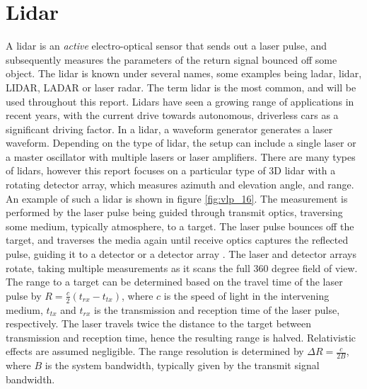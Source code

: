 \section{Lidar}
A lidar is an \textit{active} electro-optical sensor that sends out a laser pulse, and subsequently measures the parameters of the return signal bounced off some object. The lidar is known under several names, some examples being ladar, lidar, LIDAR, LADAR or laser radar. The term lidar is the most common, and will be used throughout this report. Lidars have seen a growing range of applications in recent years, with the current drive towards autonomous, driverless cars as a significant driving factor. In a lidar, a waveform generator generates a laser waveform. Depending on the type of lidar, the setup can include a single laser or a master oscillator with multiple lasers or laser amplifiers. There are many types of lidars, however this report focuses on a particular type of 3D lidar with a rotating detector array, which measures azimuth and elevation angle, and range. An example of such a lidar is shown in figure \ref{fig:vlp_16}. The measurement is performed by the laser pulse being guided through transmit optics, traversing some medium, typically atmosphere, to a target. The laser pulse bounces off the target, and traverses the media again until receive optics captures the reflected pulse, guiding it to a detector or a detector array \cite{SpieLidar}. The laser and detector arrays rotate, taking multiple measurements as it scans the full 360 degree field of view. The range to a target can be determined based on the travel time of the laser pulse by $R=\frac{c}{2}(t_{rx}-t_{tx})$, where $c$ is the speed of light in the intervening medium, $t_{tx}$ and $t_{rx}$ is the transmission and reception time of the laser pulse, respectively. The laser travels twice the distance to the target between transmission and reception time, hence the resulting range is halved. Relativistic effects are assumed negligible. The range resolution is determined by $\Delta R=\frac{c}{2B}$, where $B$ is the system bandwidth, typically given by the transmit signal bandwidth.
